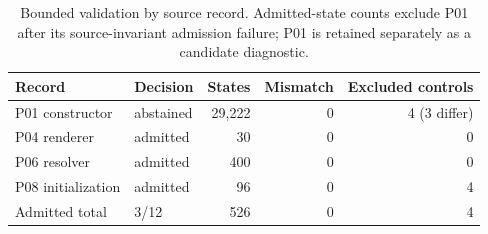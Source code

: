 \begin{table}[t]
\caption{Bounded validation by source record. Admitted-state counts exclude P01 after its source-invariant admission failure; P01 is retained separately as a candidate diagnostic.}\label{tab:adapter-cases}
\centering
\begin{tabular}{llrrr}
\toprule
Record & Decision & States & Mismatch & Excluded controls\\\midrule
P01 constructor & abstained & 29,222 & 0 & 4 (3 differ)\\
P04 renderer & admitted & 30 & 0 & 0\\
P06 resolver & admitted & 400 & 0 & 0\\
P08 initialization & admitted & 96 & 0 & 4\\
Admitted total & 3/12 & 526 & 0 & 4\\
\bottomrule
\end{tabular}
\end{table}
